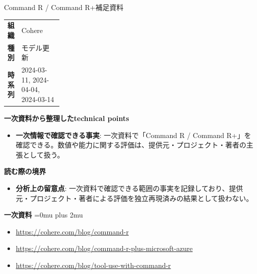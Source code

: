 \begin{technicalnote}{Command R / Command R+}{補足資料}
\begingroup
\begin{tabularx}{\linewidth}{@{}>{\bfseries}p{0.22\linewidth}X@{}}
組織 & Cohere \\
種別 & モデル更新 \\
時系列 & 2024-03-11, 2024-04-04, 2024-03-14 \\
\end{tabularx}
\smallskip
{\bfseries 一次資料から整理したtechnical points}
\begin{itemize}[leftmargin=1.5em,itemsep=0.35em]
\item \textbf{一次情報で確認できる事実}: 一次資料で「Command R / Command R+」を確認できる。数値や能力に関する評価は、提供元・プロジェクト・著者の主張として扱う。
\end{itemize}
\begin{minipage}{\linewidth}
{\bfseries 読む際の境界}
\begin{itemize}[leftmargin=1.5em,itemsep=0.35em]
\item \textbf{分析上の留意点}: 一次資料で確認できる範囲の事実を記録しており、提供元・プロジェクト・著者による評価を独立再現済みの結果として扱わない。
\end{itemize}
\begin{samepage}
{\bfseries 一次資料}
\begingroup\sloppy
\Urlmuskip=0mu plus 2mu\relax
\begin{itemize}[leftmargin=1.5em,itemsep=0.25em]
\item {\scriptsize\url{https://cohere.com/blog/command-r}}
\item {\scriptsize\url{https://cohere.com/blog/command-r-plus-microsoft-azure}}
\item {\scriptsize\url{https://cohere.com/blog/tool-use-with-command-r}}
\end{itemize}
\endgroup
\end{samepage}
\end{minipage}
\endgroup
\end{technicalnote}
\medskip

